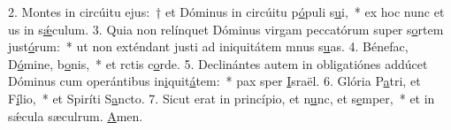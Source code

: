 2. Montes in circúitu ejus:~† et Dóminus in circúitu p\uline{ó}puli s\uline{u}i,~* ex hoc nunc et us in s\uline{ǽ}culum.
3. Quia non relínquet Dóminus virgam peccatórum super s\uline{o}rtem just\uline{ó}rum:~* ut non exténdant justi ad iniquitátem mnus s\uline{u}as.
4. Bénefac, D\uline{ó}mine, b\uline{o}nis,~* et rctis c\uline{o}rde.
5. Declinántes autem in obligatiónes addúcet Dóminus cum operántibus in\uline{i}quit\uline{á}tem:~* pax sper \uline{I}sraël.
6. Glória P\uline{a}tri, et F\uline{í}lio,~* et Spiríti S\uline{a}ncto.
7. Sicut erat in princípio, et n\uline{u}nc, et s\uline{e}mper,~* et in sǽcula sæculrum. \uline{A}men.
